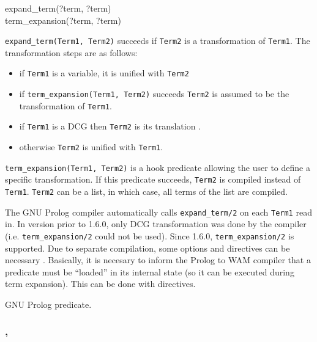 \begin{TemplatesOneCol}
expand\_term(?term, ?term)\\
term\_expansion(?term, ?term)

\end{TemplatesOneCol}

\Description

\texttt{expand\_term(Term1, Term2)} succeeds if
\texttt{Term2} is a transformation of \texttt{Term1}. The transformation
steps are as follows:

\begin{itemize}

\item if \texttt{Term1} is a variable, it is unified with \texttt{Term2}

\item if \texttt{term\_expansion(Term1, Term2)} succeeds \texttt{Term2} is
  assumed to be the transformation of \texttt{Term1}.

\item if \texttt{Term1} is a DCG then \texttt{Term2} is its translation
  .

\item otherwise \texttt{Term2} is unified with \texttt{Term1}.

\end{itemize}

\texttt{term\_expansion(Term1, Term2)} is a hook predicate allowing the user
to define a specific transformation. If this predicate succeeds,
\texttt{Term2} is compiled instead of \texttt{Term1}. \texttt{Term2} can be a
list, in which case, all terms of the list are compiled.

The GNU Prolog compiler  automatically
calls \texttt{expand\_term/2} on each \texttt{Term1} read in. In
version prior to 1.6.0, only DCG transformation was done by the
compiler (i.e. \texttt{term\_expansion/2} could not be used). Since
1.6.0, \texttt{term\_expansion/2} is supported. Due to separate
compilation, some  options and directives can be
necessary . Basically, it is necesary to
inform the Prolog to WAM compiler that a predicate must be ``loaded''
in its internal state (so it can be executed during term
expansion). This can be done with  directives.

\PlErrorsNone

\Portability

GNU Prolog predicate.

\subsubsection{,
               }

